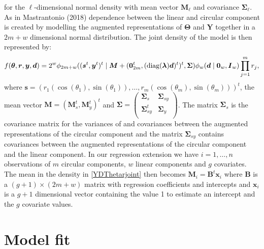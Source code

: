 \documentclass[12pt,]{article}
\begin{document}
for the \(\ell\)-dimensional normal density with mean vector
\(\boldsymbol{M}_\ell\) and covariance \(\boldsymbol{\Sigma}_\ell\). As
in Mastrantonio (2018) dependence between the linear and circular
component is created by modelling the augmented representations of
\(\boldsymbol{\Theta}\) and \(\boldsymbol{Y}\) together in a \(2m + w\)
dimensional normal distribution. The joint density of the model is then
represented by: \begin{equation}\label{YDThetarjoint} 
f(\boldsymbol{\theta}, \boldsymbol{r},
\boldsymbol{y}, \boldsymbol{d}) = 2^w\phi_{2m+w}((\boldsymbol{s}^t,
\boldsymbol{y}^t)^t \mid \boldsymbol{M} + (\boldsymbol{0}_{2m}^t, ({\rm
diag}(\boldsymbol{\lambda})\boldsymbol{d})^t)^t, \boldsymbol{\Sigma})
\phi_w(\boldsymbol{d} \mid \boldsymbol{0}_w, \boldsymbol{I}_w) \prod_{j =
1}^{m}r_j, 
\end{equation} \noindent where
\(\boldsymbol{s} = (r_1(\cos(\theta_1), \sin(\theta_1)), \dots, r_m(\cos(\theta_m), \sin(\theta_m)))^t\),
the mean vector
\(\boldsymbol{M} = (\boldsymbol{M}_s^t, \boldsymbol{M}_y^t)^t\) and
\(\boldsymbol{\Sigma} = \left ( \begin{matrix} \boldsymbol{\Sigma}_s & \boldsymbol{\Sigma}_{sy} \\ \boldsymbol{\Sigma}_{sy}^t & \boldsymbol{\Sigma}_y \\ \end{matrix} \right )\).
The matrix \(\boldsymbol{\Sigma}_s\) is the covariance matrix for the
variances of and covariances between the augmented representations of
the circular component and the matrix \(\boldsymbol{\Sigma}_{sy}\)
contains covariances between the augmented representations of the
circular component and the linear component. \newline \indent In our
regression extension we have \(i = 1, \dots, n\) observations of \(m\)
circular components, \(w\) linear components and \(g\) covariates. The
mean in the density in \eqref{YDThetarjoint} then becomes
\(\boldsymbol{M}_i = \boldsymbol{B}^t\boldsymbol{x}_i\) where
\(\boldsymbol{B}\) is a \((g + 1) \times (2m + w)\) matrix with
regression coefficients and intercepts and \(\boldsymbol{x}_i\) is a
\(g + 1\) dimensional vector containing the value 1 to estimate an
intercept and the \(g\) covariate values. \newline

\section{Model fit}
\end{document}
